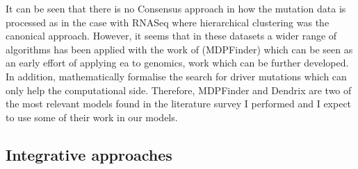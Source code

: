 It can be seen that there is no Consensus approach in how the mutation data is processed as in the case with RNASeq where hierarchical clustering was the canonical approach. However, it seems that in these datasets a wider range of algorithms has been applied with the work of \citet{Zhao2012-wj} (MDPFinder) which can be seen as an early effort of applying \acrshort{ea} to genomics, work which can be further developed. In addition, \citet{Vandin2012-cf} mathematically formalise the search for driver mutations which can only help the computational side. Therefore, MDPFinder and Dendrix are two of the most relevant models found in the literature survey I performed and I expect to use some of their work in our models.





\subsection{Integrative approaches} \label{s:lit:multi-view}

\vspace{3mm}
\vspace{3mm}

